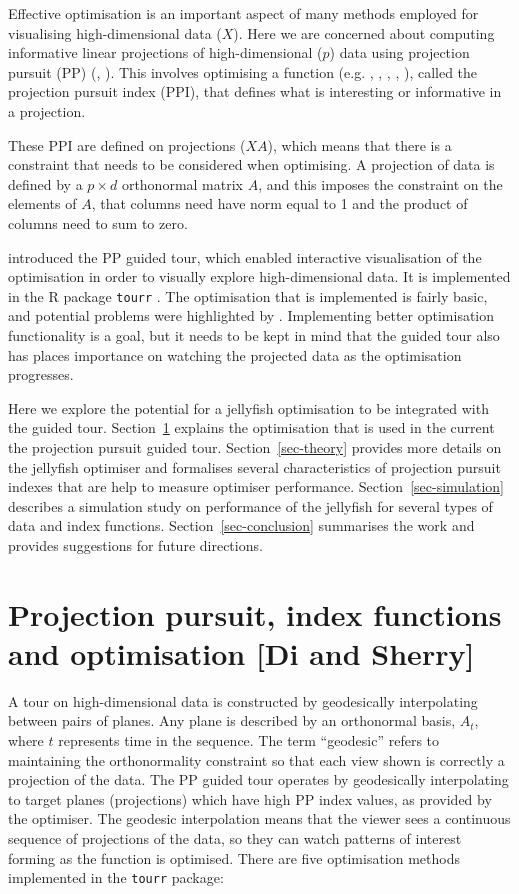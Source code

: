 \documentclass[
  number,
  preprint,
  3p]{elsarticle}
\begin{document}
Effective optimisation is an important aspect of many methods employed
for visualising high-dimensional data (\(X\)). Here we are concerned
about computing informative linear projections of high-dimensional
(\(p\)) data using projection pursuit (PP) (\citet{kr69}, \citet{FT74}).
This involves optimising a function (e.g. \citet{hall1989polynomial},
\citet{cook1993projection}, \citet{lee2010projection},
\citet{Loperfido2018}, \citet{Loperfido2020}), called the projection
pursuit index (PPI), that defines what is interesting or informative in
a projection.

These PPI are defined on projections (\(XA\)), which means that there is
a constraint that needs to be considered when optimising. A projection
of data is defined by a \(p\times d\) orthonormal matrix \(A\), and this
imposes the constraint on the elements of \(A\), that columns need have
norm equal to 1 and the product of columns need to sum to zero.

\citet{cook1995grand} introduced the PP guided tour, which enabled
interactive visualisation of the optimisation in order to visually
explore high-dimensional data. It is implemented in the R \citep{R}
package \texttt{tourr} \citep{tourr}. The optimisation that is
implemented is fairly basic, and potential problems were highlighted by
\citet{RJ-2021-105}. Implementing better optimisation functionality is a
goal, but it needs to be kept in mind that the guided tour also has
places importance on watching the projected data as the optimisation
progresses.

Here we explore the potential for a jellyfish optimisation to be
integrated with the guided tour. Section~\ref{sec-background} explains
the optimisation that is used in the current the projection pursuit
guided tour. Section~\ref{sec-theory} provides more details on the
jellyfish optimiser and formalises several characteristics of projection
pursuit indexes that are help to measure optimiser performance.
Section~\ref{sec-simulation} describes a simulation study on performance
of the jellyfish for several types of data and index functions.
Section~\ref{sec-conclusion} summarises the work and provides
suggestions for future directions.

\section{Projection pursuit, index functions and optimisation {[}Di and
Sherry{]}}\label{sec-background}

A tour on high-dimensional data is constructed by geodesically
interpolating between pairs of planes. Any plane is described by an
orthonormal basis, \(A_t\), where \(t\) represents time in the sequence.
The term ``geodesic'' refers to maintaining the orthonormality
constraint so that each view shown is correctly a projection of the
data. The PP guided tour operates by geodesically interpolating to
target planes (projections) which have high PP index values, as provided
by the optimiser. The geodesic interpolation means that the viewer sees
a continuous sequence of projections of the data, so they can watch
patterns of interest forming as the function is optimised. There are
five optimisation methods implemented in the \texttt{tourr} package:
\end{document}
